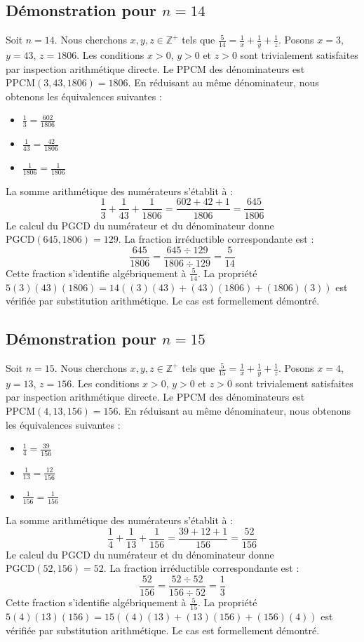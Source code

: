 \documentclass[12pt,a4paper]{article}
\begin{document}
\subsection{Démonstration pour $n = 14$}
Soit $n = 14$. Nous cherchons $x, y, z \in \mathbb{Z}^{+}$ tels que $\frac{5}{14} = \frac{1}{x} + \frac{1}{y} + \frac{1}{z}$.
Posons $x = 3$, $y = 43$, $z = 1806$.
Les conditions $x > 0$, $y > 0$ et $z > 0$ sont trivialement satisfaites par inspection arithmétique directe.
Le PPCM des dénominateurs est $\text{PPCM}(3, 43, 1806) = 1806$.
En réduisant au même dénominateur, nous obtenons les équivalences suivantes :
\begin{itemize}
    \item $\frac{1}{3} = \frac{602}{1806}$
    \item $\frac{1}{43} = \frac{42}{1806}$
    \item $\frac{1}{1806} = \frac{1}{1806}$
\end{itemize}
La somme arithmétique des numérateurs s'établit à :
$$ \frac{1}{3} + \frac{1}{43} + \frac{1}{1806} = \frac{602 + 42 + 1}{1806} = \frac{645}{1806} $$
Le calcul du PGCD du numérateur et du dénominateur donne $\text{PGCD}(645, 1806) = 129$.
La fraction irréductible correspondante est :
$$ \frac{645}{1806} = \frac{645 \div 129}{1806 \div 129} = \frac{5}{14} $$
Cette fraction s'identifie algébriquement à $\frac{5}{14}$.
La propriété $5(3)(43)(1806) = 14((3)(43) + (43)(1806) + (1806)(3))$ est vérifiée par substitution arithmétique.
Le cas est formellement démontré.

\subsection{Démonstration pour $n = 15$}
Soit $n = 15$. Nous cherchons $x, y, z \in \mathbb{Z}^{+}$ tels que $\frac{5}{15} = \frac{1}{x} + \frac{1}{y} + \frac{1}{z}$.
Posons $x = 4$, $y = 13$, $z = 156$.
Les conditions $x > 0$, $y > 0$ et $z > 0$ sont trivialement satisfaites par inspection arithmétique directe.
Le PPCM des dénominateurs est $\text{PPCM}(4, 13, 156) = 156$.
En réduisant au même dénominateur, nous obtenons les équivalences suivantes :
\begin{itemize}
    \item $\frac{1}{4} = \frac{39}{156}$
    \item $\frac{1}{13} = \frac{12}{156}$
    \item $\frac{1}{156} = \frac{1}{156}$
\end{itemize}
La somme arithmétique des numérateurs s'établit à :
$$ \frac{1}{4} + \frac{1}{13} + \frac{1}{156} = \frac{39 + 12 + 1}{156} = \frac{52}{156} $$
Le calcul du PGCD du numérateur et du dénominateur donne $\text{PGCD}(52, 156) = 52$.
La fraction irréductible correspondante est :
$$ \frac{52}{156} = \frac{52 \div 52}{156 \div 52} = \frac{1}{3} $$
Cette fraction s'identifie algébriquement à $\frac{5}{15}$.
La propriété $5(4)(13)(156) = 15((4)(13) + (13)(156) + (156)(4))$ est vérifiée par substitution arithmétique.
Le cas est formellement démontré.
\end{document}
